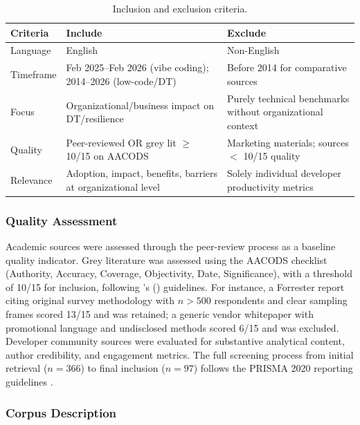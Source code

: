 \documentclass[preprint,12pt,authoryear]{elsarticle}
\begin{document}
\begin{table}[htbp]
\centering
\caption{Inclusion and exclusion criteria.}
\label{tab:criteria}
\small
\begin{tabularx}{\textwidth}{@{}lXX@{}}
\toprule
\textbf{Criteria} & \textbf{Include} & \textbf{Exclude} \\
\midrule
Language & English & Non-English \\
\addlinespace
Timeframe & Feb 2025--Feb 2026 (vibe coding); 2014--2026 (low-code/DT) & Before 2014 for comparative sources \\
\addlinespace
Focus & Organizational/business impact on DT/resilience & Purely technical benchmarks without organizational context \\
\addlinespace
Quality & Peer-reviewed OR grey lit $\geq$ 10/15 on AACODS & Marketing materials; sources $<$ 10/15 quality \\
\addlinespace
Relevance & Adoption, impact, benefits, barriers at organizational level & Solely individual developer productivity metrics \\
\bottomrule
\end{tabularx}
\end{table}

\subsubsection{Quality Assessment}

Academic sources were assessed through the peer-review process as a baseline quality indicator. Grey literature was assessed using the AACODS checklist \citep{Tyndall2010} (Authority, Accuracy, Coverage, Objectivity, Date, Significance), with a threshold of 10/15 for inclusion, following \citeauthor{Garousi2019}'s (\citeyear{Garousi2019}) guidelines. For instance, a Forrester report citing original survey methodology with $n>500$ respondents and clear sampling frames scored 13/15 and was retained; a generic vendor whitepaper with promotional language and undisclosed methods scored 6/15 and was excluded. Developer community sources were evaluated for substantive analytical content, author credibility, and engagement metrics. The full screening process from initial retrieval ($n=366$) to final inclusion ($n=97$) follows the PRISMA 2020 reporting guidelines \citep{Page2021}.

\subsubsection{Corpus Description}
\end{document}
